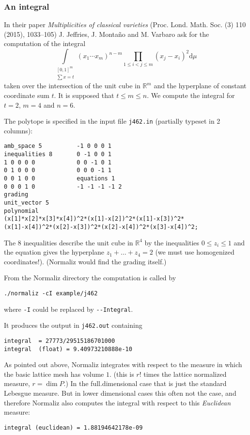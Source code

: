 \documentclass[12pt,a4paper]{scrartcl}
\theoremstyle{definition}
\def\RR{{\mathbb R}}
\def\ttt{\texttt}
\begin{document}
{\subsubsection{An integral}
In their paper \emph{Multiplicities of classical varieties} (Proc. Lond. Math. Soc. (3) 110 (2015), 1033--105) J. Jeffries, J. Monta\~no and M. Varbaro ask
for the computation of the integral
$$
\int\limits_{\substack{[0,1]^m \\ \sum{x}= t}}(x_1\cdots x_{m})^{n-m}\prod_{1\le i<j \le m}(x_j-x_i)^2 \mathrm d{\mu}\
$$
taken over the intersection of the unit cube in $\RR^m$ and the hyperplane of constant coordinate sum $t$. It is supposed that $t\le m \le n$. We compute the integral for $t=2$, $m=4$ and $n=6$.

The polytope is specified in the input file \ttt{j462.in} (partially typeset in 2
columns):

\begin{Verbatim}
amb_space 5          -1 0 0 0 1   
inequalities 8       0 -1 0 0 1   
1 0 0 0 0            0 0 -1 0 1   
0 1 0 0 0            0 0 0 -1 1   
0 0 1 0 0            equations 1  
0 0 0 1 0            -1 -1 -1 -1 2
grading
unit_vector 5
polynomial
(x[1]*x[2]*x[3]*x[4])^2*(x[1]-x[2])^2*(x[1]-x[3])^2*
(x[1]-x[4])^2*(x[2]-x[3])^2*(x[2]-x[4])^2*(x[3]-x[4])^2;
\end{Verbatim}

The $8$ inequalities describe the unit cube in $\RR^4$ by the inequalities  $0\le z_i\le 1$
and the equation gives the hyperplane $z_1+\dots+z_4=2$ (we must use homogenized coordinates!). (Normaliz would find the grading itself.)

From the Normaliz directory the computation is called by

\begin{Verbatim}
./normaliz -cI example/j462
\end{Verbatim}
where \verb|-I| could be replaced by \verb|--Integral|.

It produces the output in \ttt{j462.out} containing

\begin{Verbatim}
integral  = 27773/29515186701000
integral  (float) = 9.40973210888e-10
\end{Verbatim}

As pointed out above, Normaliz integrates with respect to the measure in which the basic lattice mesh has volume $1$. (this is $r!$ times the lattice normalized measure, $r=\dim P$.) In the full.dimensional case that is just the standard Lebesgue measure. But in lower dimensional cases this often not the case, and therefore Normaliz also computes the integral with respect to this \emph{Euclidean} measure:
\begin{Verbatim}
integral (euclidean) = 1.88194642178e-09
\end{Verbatim}

}
\end{document}
